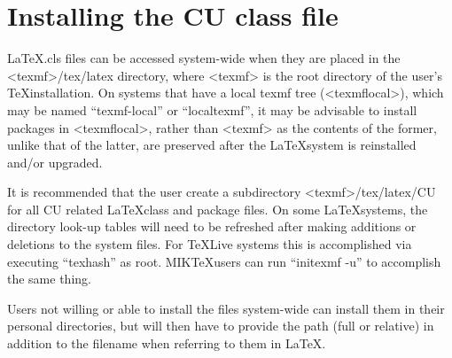 
\chapter{Installing the CU class file}

\LaTeX.cls files can be accessed system-wide when they are placed in the
<texmf>/tex/latex directory, where <texmf> is the root directory of the user’s \TeX installation. On systems that have a local texmf tree (<texmflocal>), which
may be named ``texmf-local'' or ``localtexmf'', it may be advisable to install packages in <texmflocal>, rather than <texmf> as the contents of the former, unlike that of the latter, are preserved after the \LaTeX system is reinstalled and/or upgraded.

It is recommended that the user create a subdirectory <texmf>/tex/latex/CU for all CU related \LaTeX class and package files. On some \LaTeX systems, the directory look-up tables will need to be refreshed after making additions or deletions to the system files. For \TeX Live systems this is accomplished via executing ``texhash'' as root. MIK\TeX users can run ``initexmf -u'' to accomplish the same thing.

Users not willing or able to install the files system-wide can install them in their personal directories, but will then have to provide the path (full or relative) in addition to the filename when referring to them in \LaTeX.

